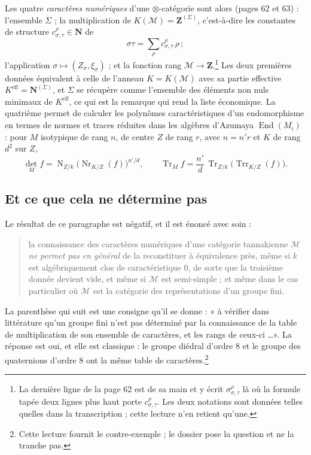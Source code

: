 \documentclass[11pt,a4paper]{article}
\begin{document}
Les quatre \emph{caractères numériques} d'une $\otimes$-catégorie sont alors
(pages 62 et 63) : l'ensemble $\Sigma$ ; la multiplication de
$K(\mathcal{M}) = \mathbf{Z}^{(\Sigma)}$, c'est-à-dire les constantes de
structure $c^{\rho}_{\sigma,\tau} \in \mathbf{N}$ de
\[
\sigma\tau = \sum_{\rho} c^{\rho}_{\sigma,\tau}\,\rho\, ;
\]
l'application $\sigma \mapsto (Z_{\sigma}, \xi_{\sigma})$ ; et la fonction rang
$\mathcal{M} \to \mathbf{Z}$.\footnote{La dernière ligne de la page 62 est de
sa main et y écrit $\sigma^{\rho}_{\sigma,\tau}$ là où la formule tapée deux
lignes plus haut porte $c^{\rho}_{\sigma,\tau}$. Les deux notations sont
données telles quelles dans la transcription ; cette lecture n'en retient
qu'une.} Les deux premières données équivalent à celle de l'anneau
$K = K(\mathcal{M})$ avec sa partie effective $K^{\mathrm{eff}} =
\mathbf{N}^{(\Sigma)}$, et $\Sigma$ se récupère comme l'ensemble des
éléments non nuls minimaux de $K^{\mathrm{eff}}$, ce qui est la remarque qui
rend la liste économique. La quatrième permet de calculer les polynômes
caractéristiques d'un endomorphisme en termes de normes et traces réduites dans
les algèbres d'Azumaya $\operatorname{End}(M_{i})$ : pour $M$ isotypique de
rang $n$, de centre $Z$ de rang $r$, avec $n = n'r$ et $K$ de rang $d^{2}$ sur
$Z$,
\[
\operatorname{det}_{M} f = \operatorname{N}_{Z/k}\bigl( \operatorname{Nr}_{K/Z}(f) \bigr)^{n'/d} ,
\qquad
\operatorname{Tr}_{M} f = \frac{n'}{d}\,\operatorname{Tr}_{Z/k}\bigl( \operatorname{Trr}_{K/Z}(f) \bigr) .
\]

\subsection*{Et ce que cela ne détermine pas}

Le résultat de ce paragraphe est négatif, et il est énoncé avec soin :
\begin{quote}
la connaissance des caractères numériques d'une catégorie tannakienne
$\mathcal{M}$ \emph{ne permet pas en général} de la reconstituer à équivalence
près, même si $k$ est algébriquement clos de caractéristique $0$, de sorte
que la troisième donnée devient vide, et même si $\mathcal{M}$ est
semi-simple ; et même dans le cas particulier où $\mathcal{M}$ est la catégorie
des représentations d'un groupe fini.
\end{quote}
La parenthèse qui suit est une consigne qu'il se donne : « à vérifier dans
littérature qu'un groupe fini n'est pas déterminé par la connaissance de la
table de multiplication de son ensemble de caractères, et les rangs de ceux-ci
\ldots ». La réponse est oui, et elle est classique : le groupe diédral d'ordre
$8$ et le groupe des quaternions d'ordre $8$ ont la même table de
caractères.\footnote{Cette lecture fournit le contre-exemple ; le dossier pose
la question et ne la tranche pas.}
\end{document}
